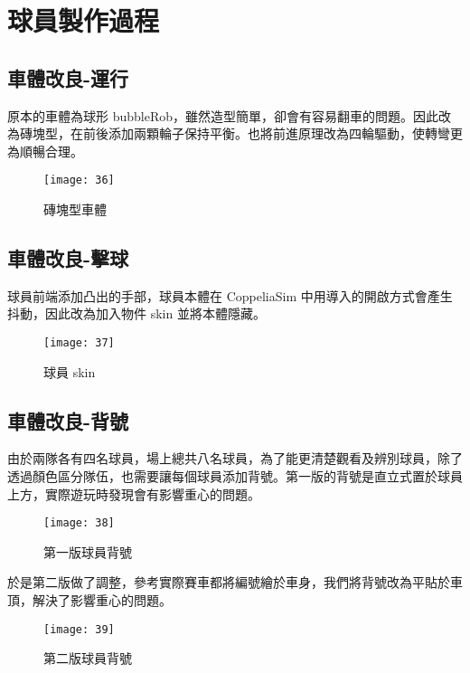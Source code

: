 \chapter{球員製作過程}
\renewcommand{\baselinestretch}{10.0} %
\setcounter{page}{2}  %
\fontsize{14pt}{2.5pt}\sectionef
\section{車體改良-運行}
  原本的車體為球形 bubbleRob，雖然造型簡單，卻會有容易翻車的問題。因此改為磚塊型，在前後添加兩顆輪子保持平衡。也將前進原理改為四輪驅動，使轉彎更為順暢合理。\\[1pt]
\begin{figure}[hbt!]
\begin{center}
\texttt{[image: 36]}
\caption{\Large 磚塊型車體}\label{fig.36}
\end{center}
\end{figure} 
\section{車體改良-擊球}
  球員前端添加凸出的手部，球員本體在 CoppeliaSim 中用導入的開啟方式會產生抖動，因此改為加入物件 skin 並將本體隱藏。\\
\begin{figure}[hbt!]
\begin{center}
\texttt{[image: 37]}
\caption{\Large 球員 skin}\label{fig.37}
\end{center}
\end{figure} 
\newpage
\section{車體改良-背號}
  由於兩隊各有四名球員，場上總共八名球員，為了能更清楚觀看及辨別球員，除了透過顏色區分隊伍，也需要讓每個球員添加背號。第一版的背號是直立式置於球員上方，實際遊玩時發現會有影響重心的問題。\\
\begin{figure}[hbt!]
\begin{center}
\texttt{[image: 38]}
\caption{\Large 第一版球員背號}\label{fig.38}
\end{center}
\end{figure}


於是第二版做了調整，參考實際賽車都將編號繪於車身，我們將背號改為平貼於車頂，解決了影響重心的問題。\\
\begin{figure}[hbt!]
\begin{center}
\texttt{[image: 39]}
\caption{\Large 第二版球員背號}\label{fig.39}
\end{center}
\end{figure}

\renewcommand{\baselinestretch}{1} %
